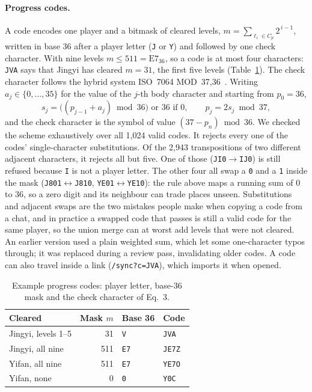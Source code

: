 \documentclass[sigconf,nonacm]{acmart}
\newcommand{\code}[1]{\texttt{\small #1}}
\begin{document}
\paragraph{Progress codes.} A code encodes one player and a bitmask of cleared levels,
$m = \sum_{\ell_i \in C_p} 2^{\,i-1}$, written in base 36 after a player letter (\code{J} or
\code{Y}) and followed by one check character. With nine levels $m \le 511 = \mathrm{E7}_{36}$, so a
code is at most four characters: \code{JVA} says that Jingyi has cleared $m = 31$, the first five
levels (Table~\ref{tab:codes}). The check character follows the hybrid system ISO~7064
MOD~37,36~\cite{iso7064}. Writing $a_j \in \{0,\dots,35\}$ for the value of the $j$-th body
character and starting from $p_0 = 36$,
\begin{equation}
  s_j = \big((p_{j-1} + a_j) \bmod 36\big) \text{ or } 36 \text{ if } 0, \qquad
  p_j = 2 s_j \bmod 37 ,
\end{equation}
and the check character is the symbol of value $(37 - p_n) \bmod 36$. We checked the scheme exhaustively over all
1{,}024 valid codes. It rejects every one of the codes' single-character substitutions. Of the
2{,}943 transpositions of two different adjacent characters, it rejects all but five. One of
those (\code{JI0}$\to$\code{IJ0}) is still refused because \code{I} is not a player letter. The
other four all swap a \code{0} and a \code{1} inside the mask (\code{J801}$\leftrightarrow$\code{J810},
\code{YE01}$\leftrightarrow$\code{YE10}): the rule above maps a running sum of 0 to 36, so a zero
digit and its neighbour can trade places unseen. Substitutions and adjacent swaps are the two
mistakes people make when copying a code from a chat, and in practice a swapped code that passes
is still a valid code for the same player, so the union merge can at worst add levels
that were not cleared. An earlier version used a plain weighted sum,
which let some one-character typos through; it was replaced during a review pass, invalidating older
codes. A code can also travel inside a link (\code{/sync?c=JVA}), which imports it when opened.

\begin{table}[t]
  \caption{Example progress codes: player letter, base-36 mask and the check character of Eq.~3.}
  \label{tab:codes}
  \small
  \begin{tabular}{@{}lrll@{}}
    \toprule
    Cleared & Mask $m$ & Base 36 & Code \\
    \midrule
    Jingyi, levels 1--5 & 31 & \code{V} & \code{JVA} \\
    Jingyi, all nine & 511 & \code{E7} & \code{JE7Z} \\
    Yifan, all nine & 511 & \code{E7} & \code{YE7O} \\
    Yifan, none & 0 & \code{0} & \code{Y0C} \\
    \bottomrule
  \end{tabular}

\end{table}
\end{document}
